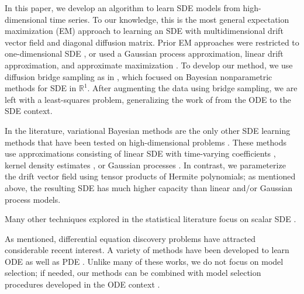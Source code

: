 In this paper, we develop an algorithm to learn SDE models from high-dimensional time series.  To our knowledge, this is the most general expectation maximization (EM) approach to learning an SDE with multidimensional drift vector field and diagonal diffusion matrix.  Prior EM approaches were restricted to one-dimensional SDE \cite{ghahramani_learning_1999}, or used a Gaussian process approximation, linear drift approximation, and approximate maximization \cite{ruttor_approximate_2013}.  To develop our method, we use diffusion bridge sampling as in \cite{van_der_meulen_reversible_2014, meulen_adaptive_2017}, which focused on Bayesian nonparametric methods for SDE in $\mathbb{R}^1$.  After augmenting the data using bridge sampling, we are left with a least-squares problem, generalizing the work of \cite{brunton_discovering_2016} from the ODE to the SDE context.

In the literature, variational Bayesian methods are the only other SDE learning methods that have been tested on high-dimensional problems \cite{vrettas_variational_2015}.  These methods use approximations consisting of linear SDE with time-varying coefficients \cite{archambeau_variational_2008}, kernel density estimates \cite{batz_variational_2016}, or Gaussian processes \cite{batz_approximate_2017}.  In contrast, we parameterize the drift vector field using tensor products of Hermite polynomials; as mentioned above, the resulting SDE has much higher capacity than linear and/or Gaussian process models.

Many other techniques explored in the statistical literature focus on scalar SDE \cite{nicolau_nonparametric_2007, muller_empirical_2010, verzelen_inferring_2012, bhat_nonparametric_2016}.

As mentioned, differential equation discovery problems have attracted considerable recent interest.  A variety of methods have been developed to learn ODE \cite{brunton_discovering_2016, schon_probabilistic_2017, chen_network_2017, tran_exact_2017, schaeffer_extracting_2017, schaeffer_learning_2017, quade_sparse_2018} as well as PDE \cite{schaeffer_sparse_2013, raissi_machine_2017, rudy_data-driven_2017, raissi_hidden_2018}.  Unlike many of these works, we do not focus on model selection; if needed, our methods can be combined with model selection procedures developed in the ODE context \cite{mangan_inferring_2016, mangan_model_2017}.

